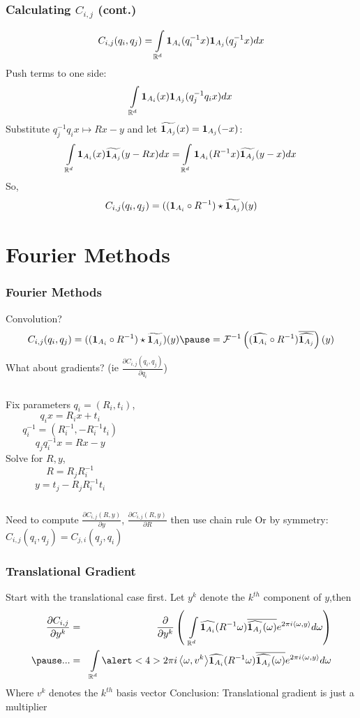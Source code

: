\documentclass{beamer}
\begin{document}
\begin{frame}
\frametitle{Calculating $C_{i,j}$ (cont.)}
\[ C_{i,j}(q_i, q_j) = \int \limits_{\mathbb{R}^d} {\bf 1}_{A_i}(q_i^{-1} x) {\bf 1}_{A_j}(q_j^{-1} x) dx \]
\pause
Push terms to one side:
\[ \int \limits_{\mathbb{R}^d} {\bf 1}_{A_i}(x) {\bf 1}_{A_j}(q_j^{-1} q_i x) dx \]
\pause
Substitute $q_j^{-1} q_i x \mapsto Rx - y$ and let $\widetilde{{\bf 1}_{A_j}}(x) = {\bf 1}_{A_j}(-x)$:
\[ \int \limits_{\mathbb{R}^d} {\bf 1}_{A_i}(x) \widetilde{{\bf 1}_{A_j}}(y - Rx) dx = 
\int \limits_{\mathbb{R}^d} {\bf 1}_{A_i}(R^{-1} x) \widetilde{{\bf 1}_{A_j}}(y - x) dx\]
\pause
So,
\[ C_{i,j}(q_i, q_j) = (({\bf 1}_{A_i} \circ R^{-1}) \star \widetilde{{\bf 1}_{A_j}})(y) \]
\end{frame}

\section{Fourier Methods}
\begin{frame}
\frametitle{Fourier Methods}
Convolution? 
\[ C_{i,j}(q_i, q_j) = ((\ind{A_i} \circ R^{-1}) \star \widetilde{\ind{A_j}})(y)
\pause
= \mathcal{F}^{-1} \left ( (\widehat{\ind{A_i}} \circ R^{-1}) \overline{\widehat{\ind{A_j}}} \right )(y) \]
\pause
What about gradients? (ie $\frac{\partial C_{i,j}(q_i, q_j)}{\partial q_i}$)
\pause
\vskip5pt
\vskip5pt
\begin{columns}
		{\centering
		Fix parameters $q_i = (R_i, t_i)$, 
		\[q_i x = R_i x + t_i \]
		\[q_i^{-1} = (R_i^{-1}, -R_i^{-1} t_i) \]
		\[q_j q_i^{-1} x = Rx - y\]
		}
		\pause
		{\centering
		Solve for $R, y$,
		\[ R = R_j R_i^{-1} \]
		\[ y = t_j - R_j R_i^{-1} t_i \]
		}
\end{columns}
\pause
Need to compute $\frac{\partial C_{i,j}(R, y)}{\partial y}$, $\frac{\partial C_{i,j}(R, y)}{\partial R}$ then use chain rule
\vskip5pt
Or by symmetry: $C_{i,j}(q_i, q_j) = C_{j,i}(q_j, q_i)$
\end{frame}

\begin{frame}
\frametitle{Translational Gradient}
Start with the translational case first.
\vskip5pt
Let $y^k$ denote the $k^{th}$ component of $y$,\pause then
\begin{eqnarray*}
\frac{ \partial C_{i,j} }{ \partial y^k }
& = & \frac{ \partial }{ \partial y^k } \left( \:\: \int \limits_{\R^d} \widehat{\ind{A_i}}(R^{-1} \omega) \overline{\widehat{\ind{A_j}}(\omega)} e^{2 \pi i \inner{\omega}{y}} d \omega  \right ) \\
\pause 
...
& = & \int \limits_{\R^d} 
\alert<4>{2 \pi i \inner{\omega}{v^k}}
\widehat{\ind{A_i}}(R^{-1} \omega) \overline{\widehat{\ind{A_j}}(\omega)} e^{2 \pi i \inner{\omega}{y} } d \omega
\end{eqnarray*}
Where $v^k$ denotes the $k^{th}$ basis vector
\pause
\vskip5pt
Conclusion: Translational gradient is just a multiplier
\end{frame}
\end{document}
